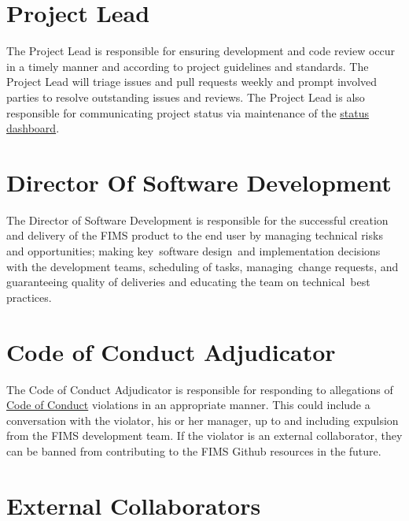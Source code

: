 \documentclass[
]{book}
\begin{document}
\hypertarget{project-lead}{%
\section{Project Lead}\label{project-lead}}

The Project Lead is responsible for ensuring development and code review occur in a timely manner and according to project guidelines and standards. The Project Lead will triage issues and pull requests weekly and prompt involved parties to resolve outstanding issues and reviews. The Project Lead is also responsible for communicating project status via maintenance of the \href{https://noaa-fims.github.io/status}{status dashboard}.

\hypertarget{director-of-software-development}{%
\section{Director Of Software Development}\label{director-of-software-development}}

The Director of Software Development is responsible for the successful creation and delivery of the FIMS product to the end user by managing technical risks and opportunities; making key~software design~and implementation decisions with the development teams, scheduling of tasks, managing~change requests, and guaranteeing quality of deliveries and educating the team on technical~best practices.

\hypertarget{code-of-conduct-adjudicator}{%
\section{Code of Conduct Adjudicator}\label{code-of-conduct-adjudicator}}

The Code of Conduct Adjudicator is responsible for responding to allegations of \protect\hyperlink{code-of-conduct}{Code of Conduct} violations in an appropriate manner. This could include a conversation with the violator, his or her manager, up to and including expulsion from the FIMS development team. If the violator is an external collaborator, they can be banned from contributing to the FIMS Github resources in the future.

\hypertarget{external-collaborators}{%
\section{External Collaborators}\label{external-collaborators}}
\end{document}
